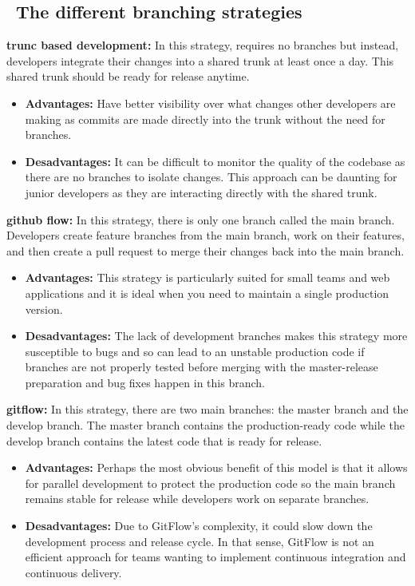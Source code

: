 \subsection*{ \textbullet\ The different branching strategies\cite{gitBranching}}
\textbf{trunc based development:} In this strategy, requires no branches but instead, developers integrate their changes into a shared trunk at least once a day. This shared trunk should be ready for release anytime.
\begin{itemize}
    \item \textbf{Advantages:} Have better visibility over what changes other developers are making as commits are made directly into the trunk without the need for branches.
    \item \textbf{Desadvantages:} It can be difficult to monitor the quality of the codebase as there are no branches to isolate changes. This approach can be daunting for junior developers as they are interacting directly with the shared trunk.
\end{itemize}
\par
\textbf{github flow:} In this strategy, there is only one branch called the main branch. Developers create feature branches from the main branch, work on their features, and then create a pull request to merge their changes back into the main branch.
\begin{itemize}
    \item \textbf{Advantages:} This strategy is particularly suited for small teams and web applications and it is ideal when you need to maintain a single production version.
    \item \textbf{Desadvantages:} The lack of development branches makes this strategy more susceptible to bugs and so can lead to an unstable production code if branches are not properly tested before merging with the master-release preparation and bug fixes happen in this branch.
\end{itemize}
\par
\textbf{gitflow:} In this strategy, there are two main branches: the master branch and the develop branch. The master branch contains the production-ready code while the develop branch contains the latest code that is ready for release.
\begin{itemize}
    \item \textbf{Advantages:} Perhaps the most obvious benefit of this model is that it allows for parallel development to protect the production code so the main branch remains stable for release while developers work on separate branches.
    \item \textbf{Desadvantages:} Due to GitFlow's complexity, it could slow down the development process and release cycle. In that sense, GitFlow is not an efficient approach for teams wanting to implement continuous integration and continuous delivery.
\end{itemize}
